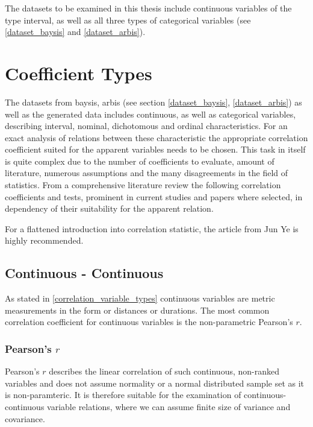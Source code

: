 \documentclass[a4paper,headsepline,footsepline,fontsize=11pt,BCOR=12mm,DIV=12]{report}
\begin{document}
The datasets to be examined in this thesis include continuous variables of the type interval, as well as all three types of categorical variables (see \ref{dataset_baysis} and \ref{dataset_arbis}).

\section{Coefficient Types}
\label{correlation_coefficient_types}
The datasets from \acrshort{baysis}, \acrshort{arbis} (see section \ref{dataset_baysis}, \ref{dataset_arbis}) as well as the generated data includes continuous, as well as categorical variables, describing interval, nominal, dichotomous and ordinal characteristics. For an exact analysis of relations between these characteristic the appropriate correlation coefficient suited for the apparent variables needs to be chosen. This task in itself is quite complex due to the number of coefficients to evaluate, amount of literature, numerous assumptions and the many disagreements in the field of statistics. From a comprehensive literature review the following correlation coefficients and tests, prominent in current studies and papers where selected, in dependency of their suitability for the apparent relation.

For a flattened introduction into correlation statistic, the article from Jun Ye \cite{Yun2020} is highly recommended. %

\subsection{Continuous - Continuous}
\label{correlation_pearson}

As stated in \ref{correlation_variable_types} continuous variables are metric measurements in the form or distances or durations. The most common correlation coefficient for continuous variables is the non-parametric Pearson's $r$.

\subsubsection{Pearson's $r$}


Pearson's $r$ describes the linear correlation of such continuous, non-ranked variables and does not assume normality or a normal distributed sample set as it is non-paramteric. It is therefore suitable for the examination of continuous-continuous variable relations, where we can assume finite size of variance and covariance. \cite{BenestyChenHuang2009,Sulthan2018}
 
\end{document}
